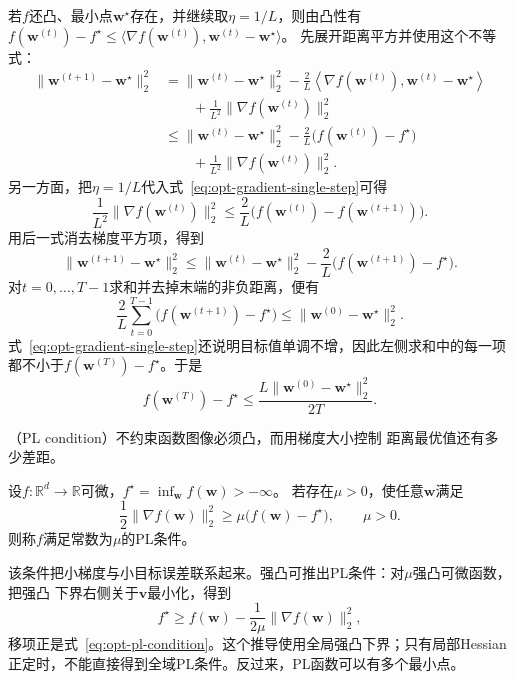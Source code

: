 若$f$还凸、最小点$\bm{w}^{\star}$存在，并继续取$\eta=1/L$，则由凸性有
$f(\bm{w}^{(t)})-f^\star
\leq\langle\nabla f(\bm{w}^{(t)}),\bm{w}^{(t)}-\bm{w}^{\star}\rangle$。
先展开距离平方并使用这个不等式：
\begin{align*}
  \lVert\bm{w}^{(t+1)}-\bm{w}^{\star}\rVert_2^2
  &=
  \lVert\bm{w}^{(t)}-\bm{w}^{\star}\rVert_2^2
  -\frac{2}{L}
  \left\langle\nabla f(\bm{w}^{(t)}),
  \bm{w}^{(t)}-\bm{w}^{\star}\right\rangle\\
  &\qquad
  +\frac{1}{L^2}\lVert\nabla f(\bm{w}^{(t)})\rVert_2^2\\
  &\leq
  \lVert\bm{w}^{(t)}-\bm{w}^{\star}\rVert_2^2
  -\frac{2}{L}\bigl(f(\bm{w}^{(t)})-f^\star\bigr)\\
  &\qquad
  +\frac{1}{L^2}\lVert\nabla f(\bm{w}^{(t)})\rVert_2^2.
\end{align*}
另一方面，把$\eta=1/L$代入式~\eqref{eq:opt-gradient-single-step}可得
\[
  \frac{1}{L^2}\lVert\nabla f(\bm{w}^{(t)})\rVert_2^2
  \leq
  \frac{2}{L}\bigl(
  f(\bm{w}^{(t)})-f(\bm{w}^{(t+1)})\bigr).
\]
用后一式消去梯度平方项，得到
\[
  \lVert\bm{w}^{(t+1)}-\bm{w}^{\star}\rVert_2^2
  \leq
  \lVert\bm{w}^{(t)}-\bm{w}^{\star}\rVert_2^2
  -\frac{2}{L}\bigl(f(\bm{w}^{(t+1)})-f^\star\bigr).
\]
对$t=0,\ldots,T-1$求和并去掉末端的非负距离，便有
\[
  \frac{2}{L}\sum_{t=0}^{T-1}
  \bigl(f(\bm{w}^{(t+1)})-f^\star\bigr)
  \leq
  \lVert\bm{w}^{(0)}-\bm{w}^{\star}\rVert_2^2.
\]
式~\eqref{eq:opt-gradient-single-step}还说明目标值单调不增，因此左侧求和中的每一项
都不小于$f(\bm{w}^{(T)})-f^\star$。于是
\begin{equation}
  f(\bm{w}^{(T)})-f^\star
  \leq\frac{L\lVert\bm{w}^{(0)}-\bm{w}^{\star}\rVert_2^2}{2T}.
  \label{eq:opt-convex-gradient-rate}
\end{equation}

（PL condition）不约束函数图像必须凸，而用梯度大小控制
距离最优值还有多少差距。
\begin{definition}
\label{def:opt-pl-condition}
设$f:\mathbb{R}^d\to\mathbb{R}$可微，$f^\star=\inf_{\bm{w}}f(\bm{w})> -\infty$。
若存在$\mu>0$，使任意$\bm{w}$满足
\begin{equation}
  \frac{1}{2}\lVert\nabla f(\bm{w})\rVert_2^2
  \geq \mu\bigl(f(\bm{w})-f^{\star}\bigr),
  \qquad \mu>0.
  \label{eq:opt-pl-condition}
\end{equation}
则称$f$满足常数为$\mu$的PL条件。
\end{definition}
该条件把小梯度与小目标误差联系起来。强凸可推出PL条件：对$\mu$强凸可微函数，把强凸
下界右侧关于$\bm{v}$最小化，得到
\[
  f^\star\geq
  f(\bm{w})-\frac{1}{2\mu}\lVert\nabla f(\bm{w})\rVert_2^2,
\]
移项正是式~\eqref{eq:opt-pl-condition}。这个推导使用全局强凸下界；只有局部Hessian
正定时，不能直接得到全域PL条件。反过来，PL函数可以有多个最小点。


